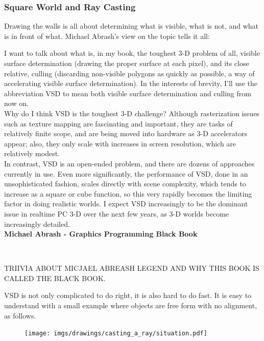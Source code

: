 \subsubsection{Square World and Ray Casting}
Drawing the walls is all about determining what is visible, what is not, and what is in front of what. Michael Abrash's view on the topic tells it all:\\
\par
\begin{fancyquotes}
I want to talk about what is, in my book, the toughest 3-D problem of all, visible surface determination (drawing the proper surface at each pixel), and its close relative, culling (discarding non-visible polygons as quickly as possible, a way of accelerating visible surface determination). In the interests of brevity, I'll use the abbreviation VSD to mean both visible surface determination and culling from now on.
 \bigskip \\
Why do I think VSD is the toughest 3-D challenge? Although rasterization issues such as texture mapping are fascinating and important, they are tasks of relatively finite scope, and are being moved into hardware as 3-D accelerators appear; also, they only scale with increases in screen resolution, which are relatively modest.
 \bigskip \\
In contrast, VSD is an open-ended problem, and there are dozens of approaches currently in use. Even more significantly, the performance of VSD, done in an unsophisticated fashion, scales directly with scene complexity, which tends to increase as a square or cube function, so this very rapidly becomes the limiting factor in doing realistic worlds. I expect VSD increasingly to be the dominant issue in realtime PC 3-D over the next few years, as 3-D worlds become increasingly detailed.
 \bigskip \\
\textbf{Michael Abrash - Graphics Programming Black Book}
 \end{fancyquotes}\\
 \par
 TRIIVIA ABOUT MICJAEL ABREASH LEGEND AND WHY THIS BOOK IS CALLED THE BLACK BOOK.\\
 \par
VSD is not only complicated to do right, it is also hard to do fast. It is easy to understand with a small example where objects are free form with no alignment, as follows.

\par
\begin{figure}[H]
\centering
\texttt{[image: imgs/drawings/casting\_a\_ray/situation.pdf]}
 
\end{figure}

